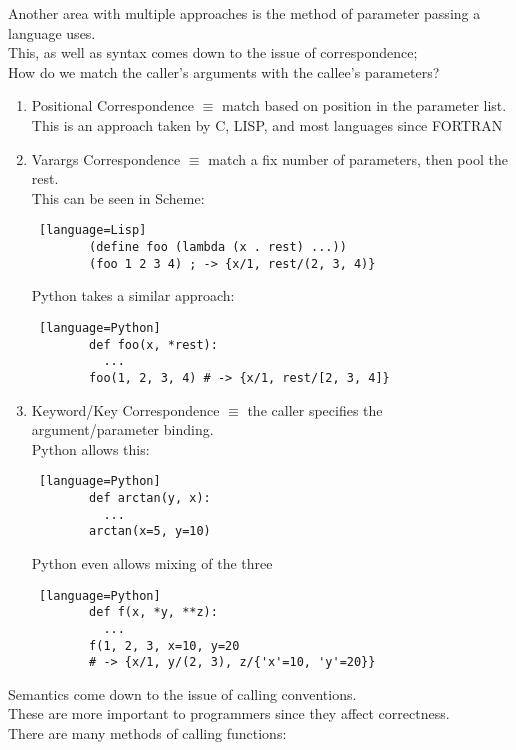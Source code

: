 \documentclass[../../lecture_notes.tex]{subfiles}
\begin{document}
Another area with multiple approaches is the method of parameter passing a language uses.\\
This, as well as syntax comes down to the issue of correspondence;\\
 How do we match the caller’s arguments with the callee’s parameters?
\begin{enumerate} [itemsep=0mm]
	\item Positional Correspondence $\equiv$ match based on position in the parameter list.\\
 		This is an approach taken by C, LISP, and most languages since FORTRAN
	\item Varargs Correspondence $\equiv$ match a fix number of parameters, then pool the rest.\\
		This can be seen in Scheme:
		\begin{lstlisting} [language=Lisp]
		(define foo (lambda (x . rest) ...))
		(foo 1 2 3 4) ; -> {x/1, rest/(2, 3, 4)}
		\end{lstlisting}
		Python takes a similar approach:
		\begin{lstlisting} [language=Python]
		def foo(x, *rest):
		  ...
		foo(1, 2, 3, 4) # -> {x/1, rest/[2, 3, 4]}
		\end{lstlisting}
 	\item Keyword/Key Correspondence $\equiv$ the caller specifies the argument/parameter binding.\\
		Python allows this:
		\begin{lstlisting} [language=Python]
		def arctan(y, x):
		  ...
		arctan(x=5, y=10)
		\end{lstlisting}
		Python even allows mixing of the three
		\begin{lstlisting} [language=Python]
		def f(x, *y, **z):
		  ...
		f(1, 2, 3, x=10, y=20 
		# -> {x/1, y/(2, 3), z/{'x'=10, 'y'=20}}
		\end{lstlisting} \smallskip
\end{enumerate}
\noindent Semantics come down to the issue of calling conventions.\\
These are more important to programmers since they affect correctness.\\
There are many methods of calling functions:
\end{document}
